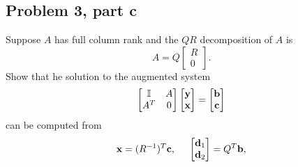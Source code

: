 \newpage
\subsection{Problem 3, part c}
Suppose $A$ has full column rank and the $QR$ decomposition of $A$ is 
\[
A = Q\begin{bmatrix}R\\0\end{bmatrix}.
\]
Show that he solution to the augmented system
\[
\begin{bmatrix}\mathbb{I} &A\\A^T &0\end{bmatrix}\begin{bmatrix}\textbf{y}\\\textbf{x}\end{bmatrix}
=
\begin{bmatrix}\textbf{b}\\\textbf{c}\end{bmatrix}
\]
can be computed from
\[
\textbf{x} = (R^{-1})^T \textbf{c}, \hspace{5mm} \begin{bmatrix}\textbf{d}_1\\\textbf{d}_2\end{bmatrix} = Q^T\textbf{b},
\]

